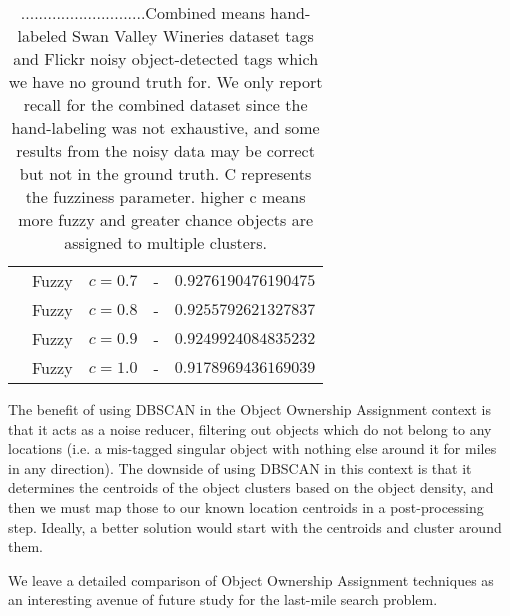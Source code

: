 {\begin{table}[h!]
\begin{center}
\begin{tabular}{ |c|c|c|c|c| }
				& Fuzzy & $c = 0.7$ & - & $0.9276190476190475$  \\ 
				& Fuzzy & $c = 0.8$ & - & $0.9255792621327837$  \\ 
				& Fuzzy & $c = 0.9$ & - & $0.9249924084835232$  \\ 
				& Fuzzy & $c = 1.0$ & - & $0.9178969436169039$  \\ 
			\hline
		\end{tabular}
		\caption{ ............................Combined means hand-labeled Swan Valley Wineries dataset tags and Flickr noisy object-detected tags which we have no ground truth for. We only report recall for the combined dataset since the hand-labeling was not exhaustive, and some results from the noisy data may be correct but not in the ground truth. C represents the fuzziness parameter. higher c means more fuzzy and greater chance objects are assigned to multiple clusters.}
        \label{table:clustering}
	\end{center}
\end{table}
}





The benefit of using DBSCAN in the Object Ownership Assignment context is that it acts as a noise reducer, filtering out objects which do not belong to any locations (i.e. a mis-tagged singular object with nothing else around it for miles in any direction). 
The downside of using DBSCAN in this context is that it determines the centroids of the object clusters based on the object density, and then we must map those to our known location centroids in a post-processing step. 
Ideally, a better solution would start with the centroids and cluster around them. 

We leave a detailed comparison of Object Ownership Assignment techniques as an interesting avenue of future study for the last-mile search problem.


